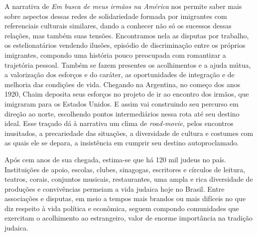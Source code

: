 
A narrativa de \textit{Em busca de meus irmãos na América} nos permite 
saber mais sobre aspectos dessas redes
de solidariedade formada por imigrantes com referenciais culturais
similares, dando a conhecer não só os sucessos dessas relações, mas
também suas tensões. Encontramos nela as disputas por trabalho, os
estelionatários vendendo ilusões, episódio de discriminação entre os
próprios imigrantes, compondo uma história pouco preocupada com
romantizar a trajetória pessoal. Também se fazem presentes 
os acolhimentos e a ajuda mútua, a valorização dos esforços e do
caráter, as oportunidades de integração e de melhoria das condições de
vida. Chegando na Argentina, no começo dos anos 1920, Chaim deposita
seus esforços no projeto de ir ao encontro dos irmãos, que imigraram
para os Estados Unidos. E assim vai construindo seu percurso em direção
ao norte, escolhendo pontos intermediários nessa rota até seu destino
ideal. Esse traçado dá à narrativa um clima de \textit{road-movie}, pelos
encontros inusitados, a precariedade das situações, a diversidade de
cultura e costumes com as quais ele se depara, a insistência em cumprir
seu destino autoproclamado.


Após cem anos de sua chegada, estima-se que há 120 mil judeus no país. Instituições de apoio,
escolas, clubes, sinagogas, escritores e círculos de leitura, teatros,
corais, conjuntos musicais, restaurantes, uma ampla e rica diversidade
de produções e convivências permeiam a vida judaica hoje no Brasil.
Entre associações e disputas, em meio a tempos mais brandos ou mais
difíceis no que diz respeito à vida política e econômica, seguem
compondo comunidades que exercitam o acolhimento ao estrangeiro, valor
de enorme importância na tradição judaica.

